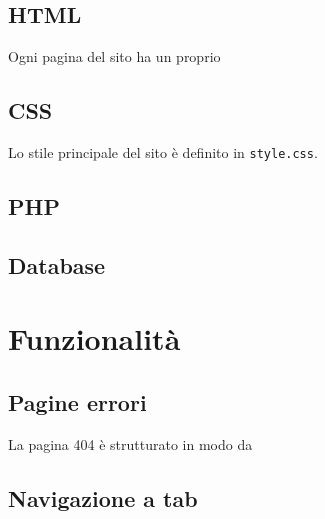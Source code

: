\documentclass{article}
\begin{document}
\subsection{HTML}
Ogni pagina del sito ha un proprio 
\subsection{CSS}
Lo stile principale del sito è definito in \verb|style.css|.
\subsection{PHP}
\subsection{Database}
\section{Funzionalità}
\subsection{Pagine errori}
La pagina 404 è strutturato in modo da 
\subsection{Navigazione a tab}
\end{document}
